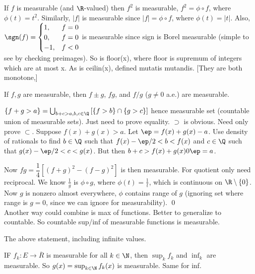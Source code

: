 \begin{ex}
If $f$ is measurable (and $\R$-valued) then $f^2$ is measurable, $f^2= \phi \circ f$, where $\phi(t)=t^2$. Similarly, $|f|$ is measurable since $|f|= \phi \circ f$, where $\phi(t)=|t|$. Also, $\sgn(f) = \begin{cases} 1, & f=0 \\ 0, & f=0 \\ -1, & f<0 \end{cases}$ is measurable since sign is Borel measurable (simple to see by checking preimages). So is floor(x), where floor is supremum of integers which are at most x. As is ceilin(x), defined mutatis mutandis. [They are both monotone,]

\end{ex}


\begin{thm}
If $f,g$ are measurable, then $f \pm g$, $fg$, and $f/g$ ($g \neq 0$ a.e.) are measurable.
\end{thm}

\pf $\{f+g>a\}= \bigcup_{b+c>a, b,c \in \Q} \left[ \{f>b\} \cap \{g>c\} \right]$ hence measurable set (countable union of measurable sets). Just need to prove equality. $\supset$ is obvious. Need only prove $\subset$. Suppose $f(x)+g(x)>a$. Let $\ep= f(x)+g(x)-a$. Use density of rationals to find $b \in \Q$ such that $f(x)- \ep/2<b<f(x)$ and $c \in \Q$ such that $g(x) - \ep/2<c<g(x)$. But then $b+c>f(x)+g(x)0\ep=a$. 

Now $fg= \dfrac{1}{4} \left[ (f+g)^2 - (f-g)^2 \right]$ is then measurable. For quotient only need reciprocal. We know $\frac{1}{g}$ is $\phi \circ g$, where $\phi(t)=\frac{1}{t}$, which is continuous on $\R \setminus \{0\}$. Now $g$ is nonzero almost everywhere, $\phi$ contains range of $g$ (ignoring set where range is $g=0$, since we can ignore for measurability). \qed \\



Another way could combine is max of functions. Better to generalize to countable. So countable sup/inf of measurable functions is measurable.

\begin{thm}
The above statement, including infinite values. 
\end{thm}

\pf IF $f_k: E \to \overline{R}$ is measurable for all $k \in \N$, then $\sup_k f_k$ and $\inf_k$ are measurable. So $g(x)= \sup_{k \in \N} f_k(x)$ is measurable. Same for inf. 


